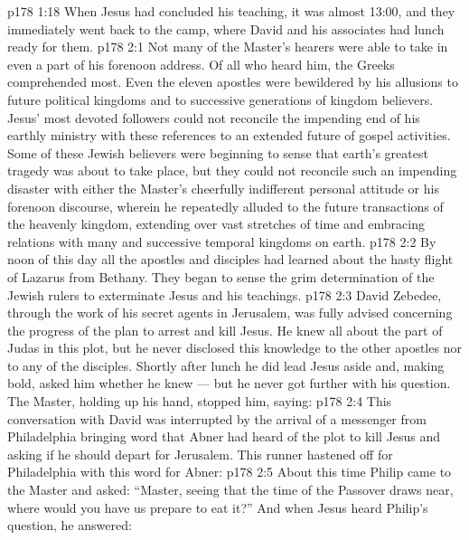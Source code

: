 \vs p178 1:18 \pc When Jesus had concluded his teaching, it was almost 13:00, and they immediately went back to the camp, where David and his associates had lunch ready for them.
\vs p178 2:1 Not many of the Master’s hearers were able to take in even a part of his forenoon address. Of all who heard him, the Greeks comprehended most. Even the eleven apostles were bewildered by his allusions to future political kingdoms and to successive generations of kingdom believers. Jesus’ most devoted followers could not reconcile the impending end of his earthly ministry with these references to an extended future of gospel activities. Some of these Jewish believers were beginning to sense that earth’s greatest tragedy was about to take place, but they could not reconcile such an impending disaster with either the Master’s cheerfully indifferent personal attitude or his forenoon discourse, wherein he repeatedly alluded to the future transactions of the heavenly kingdom, extending over vast stretches of time and embracing relations with many and successive temporal kingdoms on earth.
\vs p178 2:2 By noon of this day all the apostles and disciples had learned about the hasty flight of Lazarus from Bethany. They began to sense the grim determination of the Jewish rulers to exterminate Jesus and his teachings.
\vs p178 2:3 David Zebedee, through the work of his secret agents in Jerusalem, was fully advised concerning the progress of the plan to arrest and kill Jesus. He knew all about the part of Judas in this plot, but he never disclosed this knowledge to the other apostles nor to any of the disciples. Shortly after lunch he did lead Jesus aside and, making bold, asked him whether he knew --- but he never got further with his question. The Master, holding up his hand, stopped him, saying: 
\vs p178 2:4 This conversation with David was interrupted by the arrival of a messenger from Philadelphia bringing word that Abner had heard of the plot to kill Jesus and asking if he should depart for Jerusalem. This runner hastened off for Philadelphia with this word for Abner: 
\vs p178 2:5 About this time Philip came to the Master and asked: “Master, seeing that the time of the Passover draws near, where would you have us prepare to eat it?” And when Jesus heard Philip’s question, he answered: 
